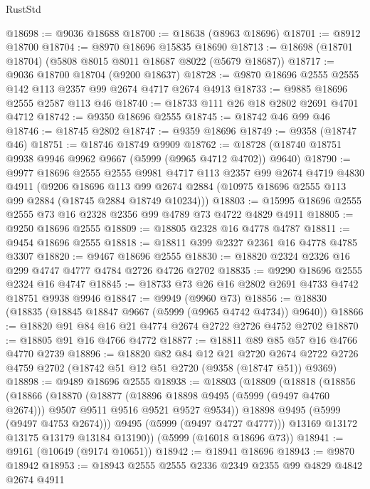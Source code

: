 \begin{lexlean}{RustStd}
\begin{coremodule}
@18698 := @9036 @18688
@18700 := @18638 (@8963 @18696)
@18701 := @8912 @18700
@18704 := @8970 @18696 @15835 @18690
@18713 := @18698 (@18701 @18704) (@5808 @8015 @8011 @18687 @8022 (@5679 @18687))
@18717 := @9036 @18700 @18704 (@9200 @18637)
@18728 := @9870 @18696 @2555 @2555 @142 @113 @2357 @99 @2674 @4717 @2674 @4913
@18733 := @9885 @18696 @2555 @2587 @113 @46
@18740 := @18733 @111 @26 @18 @2802 @2691 @4701 @4712
@18742 := @9350 @18696 @2555
@18745 := @18742 @46 @99 @46
@18746 := @18745 @2802
@18747 := @9359 @18696
@18749 := @9358 (@18747 @46)
@18751 := @18746 @18749 @9909
@18762 := @18728 (@18740 @18751 @9938 @9946 @9962 @9667 (@5999 (@9965 @4712 @4702)) @9640)
@18790 := @9977
    @18696
    @2555
    @2555
    @9981
    @4717
    @113
    @2357
    @99
    @2674
    @4719
    @4830
    @4911
    (@9206
      @18696
      @113
      @99
      @2674
      @2884
      (@10975 @18696 @2555 @113 @99 @2884 (@18745 @2884 @18749 @10234)))
@18803 := @15995 @18696 @2555 @2555 @73 @16 @2328 @2356 @99 @4789 @73 @4722 @4829 @4911
@18805 := @9250 @18696 @2555
@18809 := @18805 @2328 @16 @4778 @4787
@18811 := @9454 @18696 @2555
@18818 := @18811 @399 @2327 @2361 @16 @4778 @4785 @3307
@18820 := @9467 @18696 @2555
@18830 := @18820 @2324 @2326 @16 @299 @4747 @4777 @4784 @2726 @4726 @2702
@18835 := @9290 @18696 @2555 @2324 @16 @4747
@18845 := @18733 @73 @26 @16 @2802 @2691 @4733 @4742 @18751 @9938 @9946
@18847 := @9949 (@9960 @73)
@18856 := @18830 (@18835 (@18845 @18847 @9667 (@5999 (@9965 @4742 @4734)) @9640))
@18866 := @18820 @91 @84 @16 @21 @4774 @2674 @2722 @2726 @4752 @2702
@18870 := @18805 @91 @16 @4766 @4772
@18877 := @18811 @89 @85 @57 @16 @4766 @4770 @2739
@18896 := @18820
    @82
    @84
    @12
    @21
    @2720
    @2674
    @2722
    @2726
    @4759
    @2702
    (@18742 @51 @12 @51 @2720 (@9358 (@18747 @51)) @9369)
@18898 := @9489 @18696 @2555
@18938 := @18803
    (@18809
      (@18818
        (@18856
          (@18866
            (@18870
              (@18877
                (@18896 @18898 @9495 (@5999 (@9497 @4760 @2674)))
                @9507
                @9511
                @9516
                @9521
                @9527
                @9534))
            @18898
            @9495
            (@5999 (@9497 @4753 @2674)))
          @9495
          (@5999 (@9497 @4727 @4777)))
        @13169
        @13172
        @13175
        @13179
        @13184
        @13190))
    (@5999 (@16018 @18696 @73))
@18941 := @9161 (@10649 (@9174 @10651))
@18942 := @18941 @18696
@18943 := @9870 @18942
@18953 := @18943 @2555 @2555 @2336 @2349 @2355 @99 @4829 @4842 @2674 @4911

\end{coremodule}
\end{lexlean}
